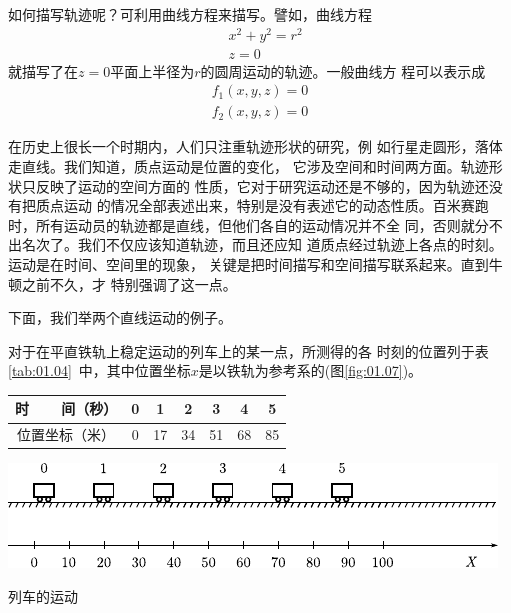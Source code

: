 如何描写轨迹呢？可利用曲线方程来描写。譬如，曲线方程 \begin{equation*}
    \begin{aligned}
        &x^2+y^2=r^2 \\[-0.5em]
        &z=0
   \end{aligned}
\end{equation*}
就描写了在$z=0$平面上半径为$r$的圆周运动的轨迹。一般曲线方
程可以表示成
\begin{equation*}
    \begin{aligned}
        f_1(x,y,z)=0 \\[-0.5em]
        f_2(x,y,z)=0
    \end{aligned}
\end{equation*}

在历史上很长一个时期内，人们只注重轨迹形状的研究，例
如行星走圆形，落体走直线。我们知道，质点运动是位置的变化，
它涉及空间和时间两方面。轨迹形状只反映了运动的空间方面的
性质，它对于研究运动还是不够的，因为轨迹还没有把质点运动
的情况全部表述出来，特别是没有表述它的动态性质。百米赛跑
时，所有运动员的轨迹都是直线，但他们各自的运动情况并不全
同，否则就分不出名次了。我们不仅应该知道轨迹，而且还应知
道质点经过轨迹上各点的时刻。运动是在时间、空间里的现象，
关键是把时间描写和空间描写联系起来。直到牛顿之前不久，才
特别强调了这一点。

下面，我们举两个直线运动的例子。

对于在平直铁轨上稳定运动的列车上的某一点，所测得的各
时刻的位置列于表\ref{tab:01.04}~中，其中位置坐标$x$是以铁轨为参考系的(图\ref{fig:01.07})。
\vspace{-1em}
\begin{tablex}[!h]
    \caption{}
    \label{tab:01.04}
    \centering
        \begin{tabularx}{\linewidth}{c*{6}{|C}}
            \toprule
            时~~~~间（秒） & 0 & 1  & 2  & 3  & 4  & 5  \\
            \midrule
            位置坐标（米） & 0 & 17 & 34 & 51 & 68 & 85 \\
            \bottomrule
        \end{tabularx}
\end{tablex}

\begin{figurex}[!h]
    \centering
    \includegraphics{figure/fig01.07}
    \caption{列车的运动}
    \label{fig:01.07}
\end{figurex}

